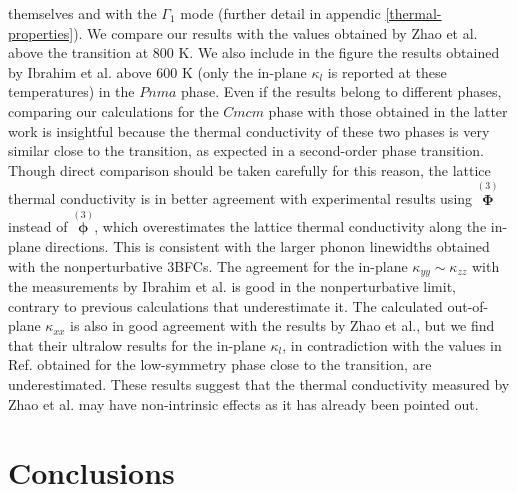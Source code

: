 themselves and with the $\Gamma_1$ mode (further detail in appendic \ref{thermal-properties}). We compare our results with the values obtained by Zhao et al.\cite{zhao2014ultralow} above the transition at $800$ K. We also include in the figure the results 
obtained by Ibrahim et al.\cite{ibrahim2017reinvestigation} above $600$ K (only the in-plane $\kappa_l$ is reported at these temperatures) in the $Pnma$ phase. Even if the results belong to different phases, comparing our 
calculations for the $Cmcm$ phase with those obtained in the latter work is insightful because the thermal conductivity of these two phases is very similar close to the transition, as expected in a second-order phase 
transition. Though direct comparison should be taken carefully for this reason, the lattice thermal conductivity is in better agreement with experimental results using $\overset{(3)}{\boldsymbol{\Phi}}$ instead 
of $\overset{(3)}{\boldsymbol{\phi}}$, which overestimates the lattice thermal conductivity along the in-plane directions. This is consistent with the larger phonon linewidths obtained with the nonperturbative 3BFCs. The 
agreement for the in-plane $\kappa_{yy} \sim \kappa_{zz}$ with the measurements by Ibrahim et al.\cite{ibrahim2017reinvestigation} is good in the nonperturbative limit, contrary to previous calculations that 
underestimate it\cite{skelton2016anharmonicity}. The calculated out-of-plane $\kappa_{xx}$ is also in good agreement with the results by Zhao et al.\cite{zhao2014ultralow}, but we find that their ultralow results for the 
in-plane $\kappa_l$, in contradiction with the values in Ref. \cite{ibrahim2017reinvestigation} obtained for the low-symmetry phase close to the transition, are underestimated. These results suggest that the thermal 
conductivity measured by Zhao et al. may have non-intrinsic effects as it has already been pointed out\cite{wei2016intrinsic}.

\section{Conclusions}

